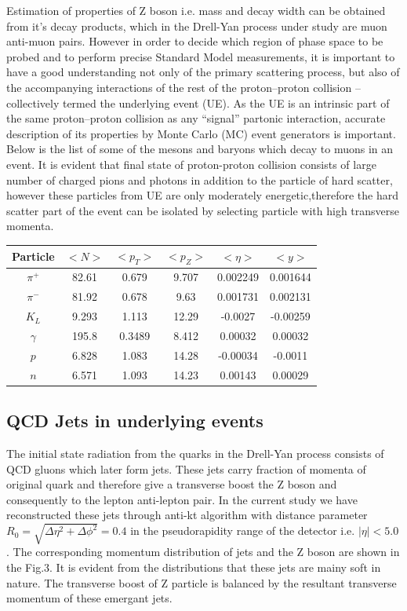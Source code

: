 \documentclass{article}		%
\begin{document}
 Estimation of properties of Z boson i.e. mass and decay width can be obtained from it's decay products, which in the Drell-Yan process under study are muon anti-muon pairs. However in order to decide which region of phase space to be probed and to perform precise Standard Model measurements, it is important to have a good understanding not only of the primary scattering process, but also of the accompanying interactions of the rest of the proton–proton collision – collectively termed the underlying event (UE). As the UE is an intrinsic part of the same proton–proton collision as any “signal” partonic interaction, accurate description of its properties by Monte Carlo (MC) event
 generators is important. Below is the list of some of the mesons and baryons which decay to muons in an event. It is evident that final state of proton-proton collision consists of large number of charged pions and photons in addition to the particle of hard scatter, however these particles from UE are only moderately energetic,therefore the hard scatter part of the event can be isolated by selecting particle with high transverse momenta.
 
\begin{center}
	\begin{tabular}{|c|c|c|c|c|c|}
		\hline
		Particle & $<N>$ & $<p_T>$ & $<p_Z>$ & $<\eta>$& $<y>$ \\
		\hline
		$\pi^+$ & 82.61 & 0.679& 9.707& 0.002249 &0.001644\\
		\hline
		$\pi^-$ & 81.92 & 0.678& 9.63& 0.001731 &0.002131\\
	    \hline
		$K_L$ & 9.293 & 1.113& 12.29& -0.0027  &-0.00259\\
		\hline
	   $\gamma$ & 195.8 & 0.3489& 8.412& 0.00032& 0.00032\\
				\hline
				
	   $p$ & 6.828 & 1.083& 14.28& -0.00034& -0.0011\\
	   \hline
	   $n$ & 6.571 & 1.093& 14.23& 0.00143& 0.00029\\
	   \hline
								

	\end{tabular}
\end{center}

\subsection{QCD Jets in underlying events }

The initial state radiation from the quarks in the Drell-Yan process consists of QCD gluons which later form jets. These jets carry fraction of momenta of original quark and therefore give a transverse boost the Z boson and consequently to the lepton anti-lepton pair. In the current study we have reconstructed these jets through anti-kt algorithm with distance parameter $ R_0 = \sqrt{\Delta \eta^2 + \Delta \phi^2} = 0.4$ in the pseudorapidity range of the detector i.e. $|\eta|<5.0$. The corresponding momentum distribution of jets and the Z boson are shown in the Fig.3. It is evident from the distributions that these jets are mainy soft in nature. The transverse boost of Z particle is balanced by the resultant transverse momentum of these emergant jets.  
\end{document}
